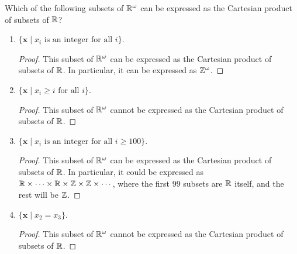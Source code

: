 \documentclass[12pt]{article}
\begin{document}
	 Which of the following subsets of $\mathbb{R}^{\omega}$ can be expressed as the Cartesian product 
	of subsets of $\mathbb{R}$?
	\begin{enumerate}[label=(\alph*)]
		\item $\{\mathbf{x} \mid x_i \text{ is an integer for all } i\}$.
		\begin{proof}
			This subset of $\mathbb{R}^\omega$ can be expressed as the Cartesian
			product of subsets of $\mathbb{R}$. In particular, it can be expressed
			as $\mathbb{Z}^\omega$.
		\end{proof}
		\item $\{\mathbf{x} \mid x_i \geq i \text{ for all } i\}$.
		\begin{proof}
			This subset of $\mathbb{R}^\omega$ cannot be expressed as the Cartesian
			product of subsets of $\mathbb{R}$.
		\end{proof}
		\item $\{\mathbf{x} \mid x_i \text{ is an integer for all } i \geq 100\}$.
		\begin{proof}
			This subset of $\mathbb{R}^\omega$ can be expressed as the Cartesian product
			of subsets of $\mathbb{R}$. In particular, it could be expressed
			as $\mathbb{R} \times \cdots \times \mathbb{R} \times \mathbb{Z} \times \mathbb{Z} \times \cdots$,
			where the first 99 subsets are $\mathbb{R}$ itself, and the rest will be 
			$\mathbb{Z}$. 
		\end{proof}
		\item $\{\mathbf{x} \mid x_2 = x_3\}$.
		\begin{proof}
			This subset of $\mathbb{R}^\omega$ cannot be expressed as the Cartesian
			product of subsets of $\mathbb{R}$.
		\end{proof}
	\end{enumerate}
\end{document}
